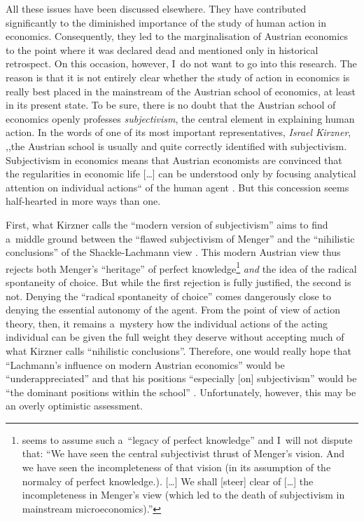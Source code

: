 All these issues have been discussed elsewhere. They have contributed significantly to the diminished importance of the study of human action in economics. Consequently, they led to the marginalisation of Austrian economics to the point where it was declared dead and mentioned only in historical retrospect. On this occasion, however, I~do not want to go into this research. The reason is that it is not entirely clear whether the study of action in economics is really best placed in the mainstream of the Austrian school of economics, at least in its present state. To be sure, there is no doubt that the Austrian school of economics openly professes \textit{subjectivism}, the central element in explaining human action. In the words of one of its most important representatives, \textit{Israel Kirzner}, ,,the Austrian school is usually and quite correctly identified with subjectivism. Subjectivism in economics means that Austrian economists are convinced that the regularities in economic life […] can be understood only by focusing analytical attention on individual actions`` of the human agent 
\parencite[][p.2:12]{kirzner_history_2016}. %
 But this concession seems half-hearted in more ways than one.



First, what Kirzner calls the ``modern version of subjectivism'' aims to find a~middle ground between the ``flawed subjectivism of Menger'' and the ``nihilistic conclusions'' of the Shackle-Lachmann view 
\parencites[][pp.14]{}[cf.][]{kirzner_ludwig_1982}. %
 This modern Austrian view thus rejects both Menger's ``heritage'' of perfect knowledge\footnote{
\parencite[][pp.14 \& 16]{meijer_subjectivism_1995} %
 seems to assume such a~``legacy of perfect knowledge'' and I~will not dispute that: ``We have seen the central subjectivist thrust of Menger's vision. And we have seen the incompleteness of that vision (in its assumption of the normalcy of perfect knowledge.). […] We shall [steer] clear of […] the incompleteness in Menger's view (which led to the death of subjectivism in mainstream microeconomics).''} \textit{and} the idea of the radical spontaneity of choice. But while the first rejection is fully justified, the second is not. Denying the ``radical spontaneity of choice'' comes dangerously close to denying the essential autonomy of the agent. From the point of view of action theory, then, it remains a~mystery how the individual actions of the acting individual can be given the full weight they deserve without accepting much of what Kirzner calls ``nihilistic conclusions''. Therefore, one would really hope that ``Lachmann's influence on modern Austrian economics'' would be ``underappreciated'' and that his positions ``especially [on] subjectivism'' would be ``the dominant positions within the school'' 
\parencite[][p.63]{storr_ludwig_2019}. %
 Unfortunately, however, this may be an overly optimistic assessment.



